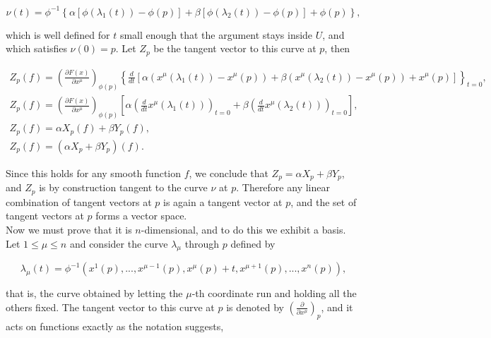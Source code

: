         \begin{equation}
            \nu(t) = \phi^{-1}\left\{\alpha\left[\phi(\lambda_1(t)) - \phi(p)\right] + \beta\left[\phi(\lambda_2(t)) - \phi(p)\right] + \phi(p)\right\},
        \end{equation}

        which is well defined for $t$ small enough that the argument stays inside $U$, and which satisfies $\nu(0) = p$. Let $Z_p$ be the tangent vector to this curve at $p$, then

        \begin{align}
            Z_p(f) = \left(\frac{\partial F(x)}{\partial x^{\mu}}\right)_{\phi(p)}\left\{\frac{d}{dt}\left[\alpha(x^{\mu}(\lambda_1(t)) - x^{\mu}(p)) + \beta(x^{\mu}(\lambda_2(t)) - x^{\mu}(p)) + x^{\mu}(p)\right]\right\}_{t=0},\\
            Z_p(f) = \left(\frac{\partial F(x)}{\partial x^{\mu}}\right)_{\phi(p)}\left[\alpha\left(\frac{d}{dt}x^{\mu}(\lambda_1(t))\right)_{t=0} + \beta\left(\frac{d}{dt}x^{\mu}(\lambda_2(t))\right)_{t=0}\right],\\
            Z_p(f) = \alpha X_p(f) + \beta Y_p(f),\\
            Z_p(f) = (\alpha X_p + \beta Y_p)(f).
        \end{align}

        Since this holds for any smooth function $f$, we conclude that $Z_p = \alpha X_p + \beta Y_p$, and $Z_p$ is by construction tangent to the curve $\nu$ at $p$. Therefore any linear combination of tangent vectors at $p$ is again a tangent vector at $p$, and the set of tangent vectors at $p$ forms a vector space.\\

        Now we must prove that it is $n$-dimensional, and to do this we exhibit a basis. Let $1 \leq \mu \leq n$ and consider the curve $\lambda_{\mu}$ through $p$ defined by

        \begin{equation}
            \lambda_{\mu}(t) = \phi^{-1}\left(x^1(p),...,x^{\mu-1}(p),x^{\mu}(p) + t , x^{\mu + 1}(p),...,x^n(p) \right),
        \end{equation}

        that is, the curve obtained by letting the $\mu$-th coordinate run and holding all the others fixed. The tangent vector to this curve at $p$ is denoted by $\left(\frac{\partial}{\partial x^{\mu}}\right)_p$, and it acts on functions exactly as the notation suggests,

